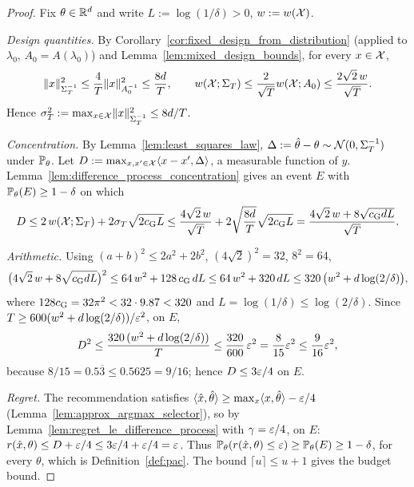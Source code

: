 \begin{proof}
Fix $\theta \in \mathbb{R}^d$ and write $L := \log(1/\delta) > 0$, $w := w(\mathcal{X})$.

\emph{Design quantities.} By Corollary~\ref{cor:fixed_design_from_distribution} (applied to
$\lambda_0$, $A_0 = A(\lambda_0)$) and Lemma~\ref{lem:mixed_design_bounds}, for every $x \in \mathcal{X}$,
\[
  \lVert x \rVert_{\Sigma_T^{-1}}^2 \le \frac4T\lVert x \rVert_{A_0^{-1}}^2 \le \frac{8d}{T},
  \qquad
  w(\mathcal{X};\Sigma_T) \le \frac{2}{\sqrt T}w(\mathcal{X};A_0) \le \frac{2\sqrt2\,w}{\sqrt T} .
\]
Hence $\sigma_T^2 := \max_{x\in\mathcal{X}}\lVert x \rVert_{\Sigma_T^{-1}}^2 \le 8d/T$.

\emph{Concentration.} By Lemma~\ref{lem:least_squares_law}, $\Delta := \hat\theta - \theta \sim
\mathcal{N}(0,\Sigma_T^{-1})$ under $\mathbb{P}_\theta$. Let $D := \max_{x,x'\in\mathcal{X}}\langle x-x', \Delta \rangle$, a
measurable function of $y$. Lemma~\ref{lem:difference_process_concentration} gives an event
$E$ with $\mathbb{P}_\theta(E) \ge 1-\delta$ on which
\[
  D \le 2\,w(\mathcal{X};\Sigma_T) + 2\sigma_T\sqrt{2c_{\mathrm{G}} L}
  \le \frac{4\sqrt2\,w}{\sqrt T} + 2\sqrt{\frac{8d}{T}}\sqrt{2c_{\mathrm{G}} L}
  = \frac{4\sqrt2\,w + 8\sqrt{c_{\mathrm{G}} dL}}{\sqrt T} .
\]

\emph{Arithmetic.} Using $(a+b)^2 \le 2a^2 + 2b^2$, $(4\sqrt2)^2 = 32$, $8^2 = 64$,
\[
  \big(4\sqrt2\,w + 8\sqrt{c_{\mathrm{G}} dL}\big)^2 \le 64\,w^2 + 128\,c_{\mathrm{G}}\,dL
  \le 64\,w^2 + 320\,dL \le 320\,\big(w^2 + d\log(2/\delta)\big),
\]
where $128c_{\mathrm{G}} = 32\pi^2 < 32\cdot 9.87 < 320$ and $L = \log(1/\delta) \le \log(2/\delta)$.
Since $T \ge 600(w^2 + d\log(2/\delta))/\varepsilon^2$, on $E$,
\[
  D^2 \le \frac{320\,(w^2 + d\log(2/\delta))}{T} \le \frac{320}{600}\,\varepsilon^2 = \frac{8}{15}\varepsilon^2
  \le \frac{9}{16}\varepsilon^2 ,
\]
because $8/15 = 0.5\overline{3} \le 0.5625 = 9/16$; hence $D \le 3\varepsilon/4$ on $E$.

\emph{Regret.} The recommendation satisfies $\langle \hat{x}, \hat\theta \rangle \ge \max_x\langle x, \hat\theta \rangle - \varepsilon/4$
(Lemma~\ref{lem:approx_argmax_selector}), so by Lemma~\ref{lem:regret_le_difference_process}
with $\gamma = \varepsilon/4$, on $E$: $r(\hat{x},\theta) \le D + \varepsilon/4 \le 3\varepsilon/4 + \varepsilon/4 = \varepsilon$.
Thus $\mathbb{P}_\theta(r(\hat{x},\theta) \le \varepsilon) \ge \mathbb{P}_\theta(E) \ge 1 - \delta$, for every $\theta$,
which is Definition~\ref{def:pac}. The bound $\lceil u\rceil \le u + 1$ gives the budget bound.
\end{proof}

